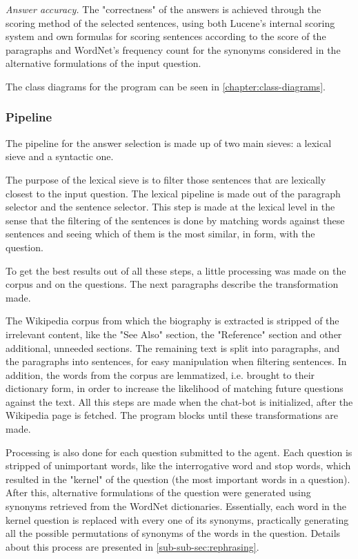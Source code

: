 {\em Answer accuracy.} The "correctness" of the answers is achieved through the scoring method of the selected sentences, using both Lucene's internal scoring system and own formulas for scoring sentences according to the score of the paragraphs and WordNet's frequency count for the synonyms considered in the alternative formulations of the input question.

The class diagrams for the program can be seen in \autoref{chapter:class-diagrams}.

\subsubsection{Pipeline}
\label{sub-sub-sec:pipeline}

The pipeline for the answer selection is made up of two main sieves: a lexical sieve and a syntactic one.

The purpose of the lexical sieve is to filter those sentences that are lexically closest to the input question. The lexical pipeline is made out of the paragraph selector and the sentence selector. This step is made at the lexical level in the sense that the filtering of the sentences is done by matching words against these sentences and seeing which of them is the most similar, in form, with the question.

To get the best results out of all these steps, a little processing was made on the corpus and on the questions. The next paragraphs describe the transformation made.

The Wikipedia corpus from which the biography is extracted is stripped of the irrelevant content, like the "See Also" section, the "Reference" section and other additional, unneeded sections. The remaining text is split into paragraphs, and the paragraphs into sentences, for easy manipulation when filtering sentences. In addition, the words from the corpus are lemmatized, i.e. brought to their dictionary form, in order to increase the likelihood of matching future questions against the text. All this steps are made when the chat-bot is initialized, after the Wikipedia page is fetched. The program blocks until these transformations are made. 

Processing is also done for each question submitted to the agent. Each question is stripped of unimportant words, like the interrogative word and stop words, which resulted in the "kernel" of the question (the most important words in a question). After this, alternative formulations of the question were generated using synonyms retrieved from the WordNet dictionaries. Essentially, each word in the kernel question is replaced with every one of its synonyms, practically generating all the possible permutations of synonyms of the words in the question. Details about this process are presented in \autoref {sub-sub-sec:rephrasing}.

